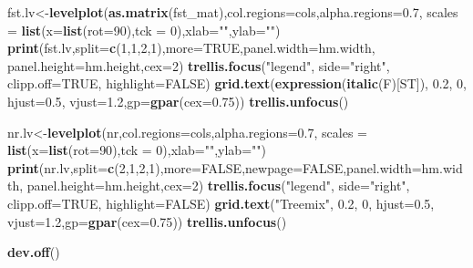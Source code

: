\documentclass[]{article}
\newenvironment{Shaded}{\begin{snugshade}}{\end{snugshade}}
\newcommand{\KeywordTok}[1]{\textcolor[rgb]{0.13,0.29,0.53}{\textbf{#1}}}
\newcommand{\DataTypeTok}[1]{\textcolor[rgb]{0.13,0.29,0.53}{#1}}
\newcommand{\DecValTok}[1]{\textcolor[rgb]{0.00,0.00,0.81}{#1}}
\newcommand{\FloatTok}[1]{\textcolor[rgb]{0.00,0.00,0.81}{#1}}
\newcommand{\StringTok}[1]{\textcolor[rgb]{0.31,0.60,0.02}{#1}}
\newcommand{\OtherTok}[1]{\textcolor[rgb]{0.56,0.35,0.01}{#1}}
\newcommand{\NormalTok}[1]{#1}
\begin{document}
\begin{Shaded}
\begin{Highlighting}[]
\NormalTok{fst.lv<-}\KeywordTok{levelplot}\NormalTok{(}\KeywordTok{as.matrix}\NormalTok{(fst_mat),}\DataTypeTok{col.regions=}\NormalTok{cols,}\DataTypeTok{alpha.regions=}\FloatTok{0.7}\NormalTok{,}
                  \DataTypeTok{scales =} \KeywordTok{list}\NormalTok{(}\DataTypeTok{x=}\KeywordTok{list}\NormalTok{(}\DataTypeTok{rot=}\DecValTok{90}\NormalTok{),}\DataTypeTok{tck =} \DecValTok{0}\NormalTok{),}\DataTypeTok{xlab=}\StringTok{""}\NormalTok{,}\DataTypeTok{ylab=}\StringTok{""}\NormalTok{)}
\KeywordTok{print}\NormalTok{(fst.lv,}\DataTypeTok{split=}\KeywordTok{c}\NormalTok{(}\DecValTok{1}\NormalTok{,}\DecValTok{1}\NormalTok{,}\DecValTok{2}\NormalTok{,}\DecValTok{1}\NormalTok{),}\DataTypeTok{more=}\OtherTok{TRUE}\NormalTok{,}\DataTypeTok{panel.width=}\NormalTok{hm.width,}
      \DataTypeTok{panel.height=}\NormalTok{hm.height,}\DataTypeTok{cex=}\DecValTok{2}\NormalTok{)}
\KeywordTok{trellis.focus}\NormalTok{(}\StringTok{"legend"}\NormalTok{, }\DataTypeTok{side=}\StringTok{"right"}\NormalTok{, }\DataTypeTok{clipp.off=}\OtherTok{TRUE}\NormalTok{, }\DataTypeTok{highlight=}\OtherTok{FALSE}\NormalTok{)}
\KeywordTok{grid.text}\NormalTok{(}\KeywordTok{expression}\NormalTok{(}\KeywordTok{italic}\NormalTok{(F)[ST]), }\FloatTok{0.2}\NormalTok{, }\DecValTok{0}\NormalTok{, }\DataTypeTok{hjust=}\FloatTok{0.5}\NormalTok{, }\DataTypeTok{vjust=}\FloatTok{1.2}\NormalTok{,}\DataTypeTok{gp=}\KeywordTok{gpar}\NormalTok{(}\DataTypeTok{cex=}\FloatTok{0.75}\NormalTok{))}
\KeywordTok{trellis.unfocus}\NormalTok{()}

\NormalTok{nr.lv<-}\KeywordTok{levelplot}\NormalTok{(nr,}\DataTypeTok{col.regions=}\NormalTok{cols,}\DataTypeTok{alpha.regions=}\FloatTok{0.7}\NormalTok{,}
                 \DataTypeTok{scales =} \KeywordTok{list}\NormalTok{(}\DataTypeTok{x=}\KeywordTok{list}\NormalTok{(}\DataTypeTok{rot=}\DecValTok{90}\NormalTok{),}\DataTypeTok{tck =} \DecValTok{0}\NormalTok{),}\DataTypeTok{xlab=}\StringTok{""}\NormalTok{,}\DataTypeTok{ylab=}\StringTok{""}\NormalTok{)}
\KeywordTok{print}\NormalTok{(nr.lv,}\DataTypeTok{split=}\KeywordTok{c}\NormalTok{(}\DecValTok{2}\NormalTok{,}\DecValTok{1}\NormalTok{,}\DecValTok{2}\NormalTok{,}\DecValTok{1}\NormalTok{),}\DataTypeTok{more=}\OtherTok{FALSE}\NormalTok{,}\DataTypeTok{newpage=}\OtherTok{FALSE}\NormalTok{,}\DataTypeTok{panel.width=}\NormalTok{hm.width,}
      \DataTypeTok{panel.height=}\NormalTok{hm.height,}\DataTypeTok{cex=}\DecValTok{2}\NormalTok{)}
\KeywordTok{trellis.focus}\NormalTok{(}\StringTok{"legend"}\NormalTok{, }\DataTypeTok{side=}\StringTok{"right"}\NormalTok{, }\DataTypeTok{clipp.off=}\OtherTok{TRUE}\NormalTok{, }\DataTypeTok{highlight=}\OtherTok{FALSE}\NormalTok{)}
\KeywordTok{grid.text}\NormalTok{(}\StringTok{"Treemix"}\NormalTok{, }\FloatTok{0.2}\NormalTok{, }\DecValTok{0}\NormalTok{, }\DataTypeTok{hjust=}\FloatTok{0.5}\NormalTok{, }\DataTypeTok{vjust=}\FloatTok{1.2}\NormalTok{,}\DataTypeTok{gp=}\KeywordTok{gpar}\NormalTok{(}\DataTypeTok{cex=}\FloatTok{0.75}\NormalTok{))}
\KeywordTok{trellis.unfocus}\NormalTok{()}

\KeywordTok{dev.off}\NormalTok{()}
\end{Highlighting}
\end{Shaded}
\end{document}
